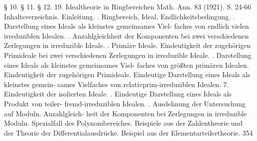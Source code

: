 \documentclass[11pt,a4paper]{article}
\theoremstyle{plain}
\theoremstyle{definition}
\begin{document}
\S{} 10. 
\S{} 11. 
\S{} 12. 
19. Idealtheorie in Ringbereichen 
Math. Ann. 83 (1921). S. 24-66 
Inhaltsverzeichnis. 
Einleitung. 
. 
Ringbereich, Ideal, Endlichkeitsbedingung. 
. 
Darstellung eines Ideals als kleinstes gemeinsames Viel- 
faches von endlich vielen irreduziblen Idealen. 
. 
Anzahlgleichheit der Komponenten bei zwei verschiedenen 
Zerlegungen in irreduzible Ideale. 
. 
Primäre Ideale. 
Eindeutigkeit der zugehörigen Primideale 
bei zwei verschiedenen Zerlegungen in irreduzible Ideale. 
. 
Darstellung eines Ideals 
als kleinstes gemeinsames Viel- 
faches von größten primären Idealen. 
Eindeutigkeit der 
zugehörigen Primideale. 
Eindeutige Darstellung eines Ideals als kleinstes gemein- 
sames Vielfaches von relativprim-irreduziblen Idealen. 
7. Eindeutigkeit der isolierten Ideale. 
. 
Eindeutige Darstellung eines Ideals als Produkt von teiler- 
fremd-irreduziblen Idealen. 
. 
Ausdehnung der Untersuchung auf Moduln. 
Anzahlgleich- 
heit 
der Komponenten 
bei Zerlegungen 
in irreduzible 
Moduln. 
Spezialfall des Polynombereiches. 
Beispiele 
aus 
der Zahlentheorie 
und 
der Theorie 
der 
Differentialausdrücke. 
Beispiel aus der Elementarteilertheorie. 
354
\end{document}
